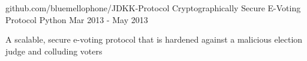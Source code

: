 \begin{cventries}
  \cventry
    {github.com/bluemellophone/JDKK-Protocol} %
    {Cryptographically Secure E-Voting Protocol} %
    {Python} %
    {Mar 2013 - May 2013} %
    {
      \begin{cvitems} %
        \item {A scalable, secure e-voting protocol that is hardened against a malicious election judge and colluding voters}
      \end{cvitems}
    }


\end{cventries}
